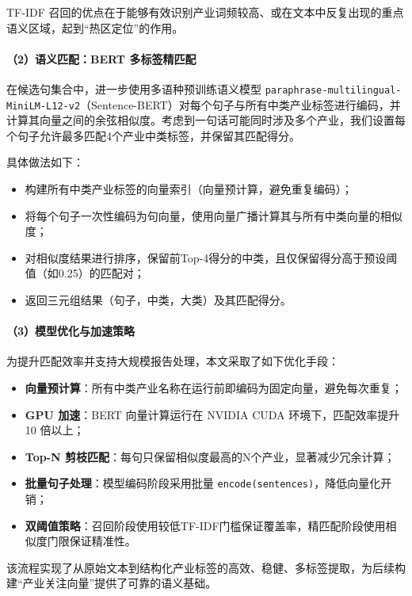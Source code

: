 \documentclass[a4paper,11pt, fontset=fandol]{ctexart}
\begin{document}
TF-IDF 召回的优点在于能够有效识别产业词频较高、或在文本中反复出现的重点语义区域，起到“热区定位”的作用。

\paragraph{（2）语义匹配：BERT 多标签精匹配}

在候选句集合中，进一步使用多语种预训练语义模型 \texttt{paraphrase-multilingual-MiniLM-L12-v2}（Sentence-BERT）对每个句子与所有中类产业标签进行编码，并计算其向量之间的余弦相似度。考虑到一句话可能同时涉及多个产业，我们设置每个句子允许最多匹配4个产业中类标签，并保留其匹配得分。

具体做法如下：
\begin{itemize}
    \item 构建所有中类产业标签的向量索引（向量预计算，避免重复编码）；
    \item 将每个句子一次性编码为句向量，使用向量广播计算其与所有中类向量的相似度；
    \item 对相似度结果进行排序，保留前Top-4得分的中类，且仅保留得分高于预设阈值（如0.25）的匹配对；
    \item 返回三元组结果（句子，中类，大类）及其匹配得分。
\end{itemize}

\paragraph{（3）模型优化与加速策略}

为提升匹配效率并支持大规模报告处理，本文采取了如下优化手段：
\begin{itemize}
    \item \textbf{向量预计算}：所有中类产业名称在运行前即编码为固定向量，避免每次重复；
    \item \textbf{GPU 加速}：BERT 向量计算运行在 NVIDIA CUDA 环境下，匹配效率提升 10 倍以上；
    \item \textbf{Top-N 剪枝匹配}：每句只保留相似度最高的N个产业，显著减少冗余计算；
    \item \textbf{批量句子处理}：模型编码阶段采用批量 \texttt{encode(sentences)}，降低向量化开销；
    \item \textbf{双阈值策略}：召回阶段使用较低TF-IDF门槛保证覆盖率，精匹配阶段使用相似度门限保证精准性。
\end{itemize}

该流程实现了从原始文本到结构化产业标签的高效、稳健、多标签提取，为后续构建“产业关注向量”提供了可靠的语义基础。
\end{document}
